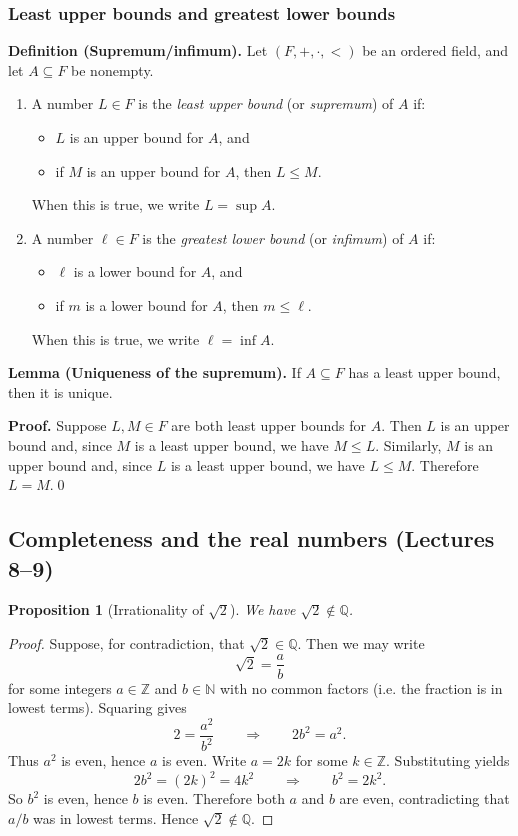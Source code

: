 \documentclass[12pt]{article}
\newtheorem{proposition}{Proposition}
\begin{document}
\subsubsection*{Least upper bounds and greatest lower bounds}
\textbf{Definition (Supremum/infimum).}
Let $(F,+,\cdot,<)$ be an ordered field, and let $A\subseteq F$ be nonempty.
\begin{enumerate}[label=\textbf{(S\arabic*)}, leftmargin=3em, itemsep=0.25em]
\item A number $L\in F$ is the \emph{least upper bound} (or \emph{supremum}) of $A$ if:
  \begin{itemize}[leftmargin=2em, itemsep=0.25em]
  \item $L$ is an upper bound for $A$, and
  \item if $M$ is an upper bound for $A$, then $L\le M$.
  \end{itemize}
  When this is true, we write $L=\sup A$.
\item A number $\ell\in F$ is the \emph{greatest lower bound} (or \emph{infimum}) of $A$ if:
  \begin{itemize}[leftmargin=2em, itemsep=0.25em]
  \item $\ell$ is a lower bound for $A$, and
  \item if $m$ is a lower bound for $A$, then $m\le \ell$.
  \end{itemize}
  When this is true, we write $\ell=\inf A$.
\end{enumerate}

\textbf{Lemma (Uniqueness of the supremum).}
If $A\subseteq F$ has a least upper bound, then it is unique.

\textbf{Proof.}
Suppose $L,M\in F$ are both least upper bounds for $A$.
Then $L$ is an upper bound and, since $M$ is a least upper bound, we have $M\le L$.
Similarly, $M$ is an upper bound and, since $L$ is a least upper bound, we have $L\le M$.
Therefore $L=M$.\qed



\subsection*{Completeness and the real numbers (Lectures 8--9)}

\begin{proposition}[Irrationality of $\sqrt{2}$]
We have $\sqrt{2}\notin\mathbb{Q}$.
\end{proposition}

\begin{proof}
Suppose, for contradiction, that $\sqrt{2}\in\mathbb{Q}$. Then we may write
\[\sqrt{2}=\frac{a}{b}\]
for some integers $a\in\mathbb{Z}$ and $b\in\mathbb{N}$ with no common factors (i.e. the fraction is in lowest terms).
Squaring gives
\[2=\frac{a^2}{b^2}\qquad\Rightarrow\qquad 2b^2=a^2.
\]
Thus $a^2$ is even, hence $a$ is even. Write $a=2k$ for some $k\in\mathbb{Z}$. Substituting yields
\[2b^2=(2k)^2=4k^2\qquad\Rightarrow\qquad b^2=2k^2.
\]
So $b^2$ is even, hence $b$ is even. Therefore both $a$ and $b$ are even, contradicting that $a/b$ was in lowest terms.
Hence $\sqrt{2}\notin\mathbb{Q}$.
\end{proof}
\end{document}
